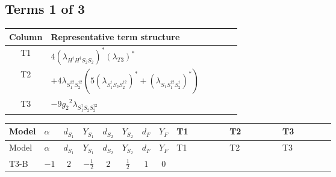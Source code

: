 \documentclass[8pt]{article}
\begin{document}
\begin{landscape}
\subsection*{Terms 1 of 3}
\begin{center}
\begin{tabular}{@{}c >{\raggedright\arraybackslash}p{0.82\linewidth}@{}}
\toprule
Column & Representative term structure \\
\midrule
T1 & \(\displaystyle 4 \left({\lambda_{H^\dagger H^\dagger S_2 S_2}}\right)^{*} \left({\lambda_{T3}}\right)^{*}\) \\
\midrule
T2 & \(\displaystyle +4 {\lambda_{S_1^{\dagger 2}S_2^{\dagger 2}}} (5 \left({\lambda_{S_1^\dagger S_2 S_2^{\dagger 2}}}\right)^{*}+\left({\lambda_{S_1 S_1^{\dagger 2}S_2^\dagger}}\right)^{*})\) \\
\midrule
T3 & \(\displaystyle -9 {g_2}^2 {\lambda_{S_1^\dagger S_2 S_2^{\dagger 2}}}\) \\
\midrule
\bottomrule
\end{tabular}
\end{center}
\smallskip
\tiny
\begin{longtable}{@{}llcccccc >{\raggedright\arraybackslash}p{0.21\linewidth} >{\raggedright\arraybackslash}p{0.21\linewidth} >{\raggedright\arraybackslash}p{0.21\linewidth}@{}}
\toprule
Model & $\alpha$ & $d_{S_1}$ & $Y_{S_1}$ & $d_{S_2}$ & $Y_{S_2}$ & $d_F$ & $Y_F$ & T1 & T2 & T3 \\
\midrule
\endfirsthead
\toprule
Model & $\alpha$ & $d_{S_1}$ & $Y_{S_1}$ & $d_{S_2}$ & $Y_{S_2}$ & $d_F$ & $Y_F$ & T1 & T2 & T3 \\
\midrule
\endhead
T3-B & $-1$ & $2$ & $-\frac{1}{2}$ & $2$ & $\frac{1}{2}$ & $1$ & $0$ & \scriptsize\adjustbox{max width=\linewidth}{$\begin{gathered} 4 \left({\lambda_{H^\dagger H^\dagger S_2 S_2}}\right)^{*} \left({\lambda_{T3}}\right)^{*}\end{gathered}$} & \scriptsize\adjustbox{max width=\linewidth}{$\begin{gathered} +4 {\lambda_{S_1^{\dagger 2}S_2^{\dagger 2}}} (5 \left({\lambda_{S_1^\dagger S_2 S_2^{\dagger 2}}}\right)^{*}+\left({\lambda_{S_1 S_1^{\dagger 2}S_2^\dagger}}\right)^{*})\end{gathered}$} & \scriptsize\adjustbox{max width=\linewidth}{$\begin{gathered} -9 {g_2}^2 {\lambda_{S_1^\dagger S_2 S_2^{\dagger 2}}}\end{gathered}$} \\
\midrule

\end{longtable}
\end{landscape}
\end{document}

